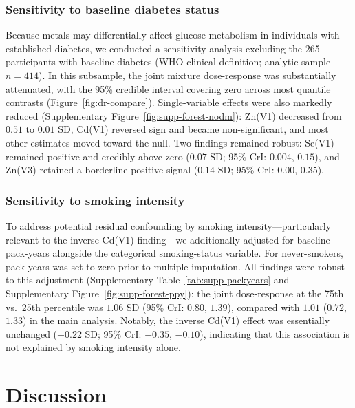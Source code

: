 \documentclass[11pt]{article}
\begin{document}
\subsubsection{Sensitivity to baseline diabetes status}

Because metals may differentially affect glucose metabolism in individuals with established diabetes, we conducted a sensitivity analysis excluding the 265 participants with baseline diabetes (WHO clinical definition; analytic sample $n = 414$). In this subsample, the joint mixture dose-response was substantially attenuated, with the 95\% credible interval covering zero across most quantile contrasts (Figure~\ref{fig:dr-compare}). Single-variable effects were also markedly reduced (Supplementary Figure~\ref{fig:supp-forest-nodm}): Zn(V1) decreased from $0.51$ to $0.01$ SD, Cd(V1) reversed sign and became non-significant, and most other estimates moved toward the null. Two findings remained robust: Se(V1) remained positive and credibly above zero ($0.07$ SD; 95\% CrI: $0.004$, $0.15$), and Zn(V3) retained a borderline positive signal ($0.14$ SD; 95\% CrI: $0.00$, $0.35$).

\subsubsection{Sensitivity to smoking intensity}

To address potential residual confounding by smoking intensity---particularly relevant to the inverse Cd(V1) finding---we additionally adjusted for baseline pack-years alongside the categorical smoking-status variable. For never-smokers, pack-years was set to zero prior to multiple imputation. All findings were robust to this adjustment (Supplementary Table~\ref{tab:supp-packyears} and Supplementary Figure~\ref{fig:supp-forest-ppy}): the joint dose-response at the 75th vs.\ 25th percentile was $1.06$ SD (95\% CrI: $0.80$, $1.39$), compared with $1.01$ ($0.72$, $1.33$) in the main analysis. Notably, the inverse Cd(V1) effect was essentially unchanged ($-0.22$ SD; 95\% CrI: $-0.35$, $-0.10$), indicating that this association is not explained by smoking intensity alone.

\section{Discussion}
\label{sec:discussion}
\end{document}
